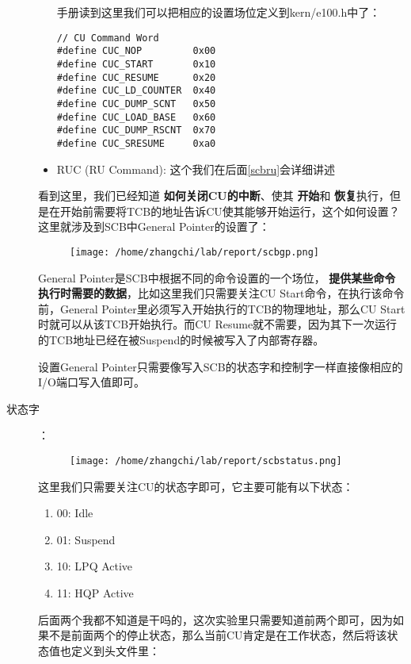 \documentclass{article}
\newcommand{\highlight}[1]{{\bfseries \color{red}  #1}}
\begin{document}
\begin{CJK*}{UTF8}{gkai}
\begin{description}
\begin{itemize}
{手册读到这里我们可以把相应的设置场位定义到kern/e100.h中了：

\begin{lstlisting}[style=ccode, title={\scriptsize \ttfamily \bfseries kern/e100.h}]
// CU Command Word
#define CUC_NOP         0x00
#define CUC_START       0x10
#define CUC_RESUME      0x20
#define CUC_LD_COUNTER  0x40
#define CUC_DUMP_SCNT   0x50
#define CUC_LOAD_BASE   0x60
#define CUC_DUMP_RSCNT  0x70
#define CUC_SRESUME     0xa0
\end{lstlisting}

}
\item{RUC (RU Command): 这个我们在后面\ref{scbru}会详细讲述}
\end{itemize}

看到这里，我们已经知道\highlight{如何关闭CU的中断}、使其\highlight{开始}和\highlight{恢复}执行，但是在开始前需要将TCB的地址告诉CU使其能够开始运行，这个如何设置？这里就涉及到SCB中General Pointer的设置了：

\begin{figure}[htp]
\centering
\texttt{[image: /home/zhangchi/lab/report/scbgp.png]}
\end{figure}

General Pointer是SCB中根据不同的命令设置的一个场位，\highlight{提供某些命令执行时需要的数据}，比如这里我们只需要关注CU Start命令，在执行该命令前，General Pointer里必须写入开始执行的TCB的物理地址，那么CU Start时就可以从该TCB开始执行。而CU Resume就不需要，因为其下一次运行的TCB地址已经在被Suspend的时候被写入了内部寄存器。

设置General Pointer只需要像写入SCB的状态字和控制字一样直接像相应的I/O端口写入值即可。

\item[状态字]：\\
\begin{figure}[htp]
\centering
\texttt{[image: /home/zhangchi/lab/report/scbstatus.png]}
\end{figure}

这里我们只需要关注CU的状态字即可，它主要可能有以下状态：

\begin{enumerate}
\item{00: Idle}
\item{01: Suspend}
\item{10: LPQ Active}
\item{11: HQP Active}
\end{enumerate}

后面两个我都不知道是干吗的，这次实验里只需要知道前两个即可，因为如果不是前面两个的停止状态，那么当前CU肯定是在工作状态，然后将该状态值也定义到头文件里：



\end{description}
\end{CJK*}
\end{document}
